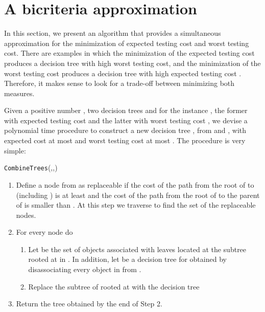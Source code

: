 \documentclass{llncs}
\begin{document}
\section{A bicriteria approximation}
\label{sec:bicriteria}
In this section,
we present an algorithm that provides a simultaneous approximation
for the minimization of expected testing cost and worst testing cost.
 There are examples in which the minimization of the expected testing
cost produces a decision tree with high worst testing cost, and the 
minimization of the worst testing
cost produces a decision tree with high expected testing cost \cite{labericml}.
Therefore, it makes sense to look for a trade-off between minimizing
both measures.




Given a positive number , two decision trees  and  for the instance ,
 the former  with expected testing cost   and the latter with worst testing cost  , we devise a polynomial time procedure 
 to construct a new decision tree , from  and , with
 expected cost at most  and
  worst testing cost at most .
The procedure is very simple:

\medskip

{\tt CombineTrees}(,,)


\begin{enumerate}


\item Define a node  from  as replaceable
if the cost of the path from the root of  to   (including ) is
at least  and the cost of the path from the root of  to the parent of 
is smaller than . At this step we traverse  to 
find the set   of the replaceable nodes.

\item For every node  do 

\begin{enumerate}

\item Let    be  the set of objects associated with leaves 
located at the subtree rooted at  in . In addition, let 
 be a decision tree for  obtained
by disassociating every object in  from .

\item Replace the subtree of  rooted at  with the decision tree


\end{enumerate}

\item Return the tree   obtained by the end of Step 2. 

\end{enumerate}
\end{document}
